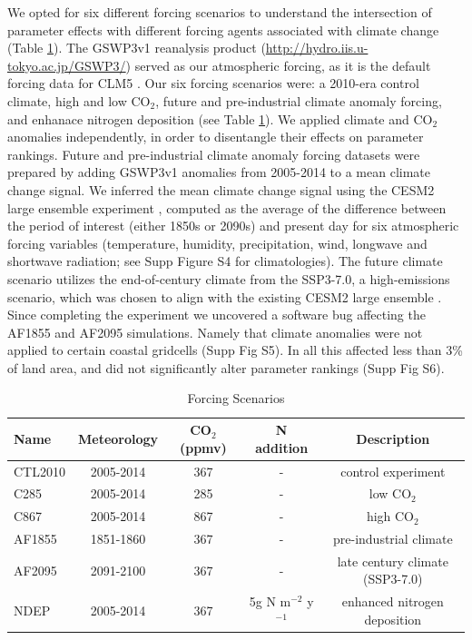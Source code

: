 \documentclass[draft]{agujournal2019}
\begin{document}
 We opted for six different forcing scenarios to understand the intersection of parameter effects with different forcing agents associated with climate change (Table \ref{tab:exps}). The GSWP3v1 reanalysis product (\url{http://hydro.iis.u-tokyo.ac.jp/GSWP3/}) served as our atmospheric forcing, as it is the default forcing data for CLM5 \cite{lawrence2019}. Our six forcing scenarios were: a 2010-era control climate, high and low CO$_2$, future and pre-industrial climate anomaly forcing, and enhanace nitrogen deposition (see Table \ref{tab:exps}).  We applied climate and CO$_2$ anomalies independently, in order to disentangle their effects on parameter rankings. Future and pre-industrial climate anomaly forcing datasets were prepared by adding GSWP3v1 anomalies from 2005-2014 to a mean climate change signal. We inferred the mean climate change signal using the CESM2 large ensemble experiment \cite{rodgers2021}, computed as the average of the difference between the period of interest (either 1850s or 2090s) and present day for six atmospheric forcing variables (temperature, humidity, precipitation, wind, longwave and shortwave radiation; see Supp Figure S4 for climatologies). The future climate scenario utilizes the end-of-century climate from the SSP3-7.0, a high-emissions scenario, which was chosen to align with the existing CESM2 large ensemble \cite{rodgers2021}. Since completing the experiment we uncovered a software bug affecting the AF1855 and AF2095 simulations. Namely that climate anomalies were not applied to certain coastal gridcells (Supp Fig S5). In all this affected less than 3\% of land area, and did not significantly alter parameter rankings (Supp Fig S6).  


 

\label{sect:exps}
 \begin{table}[h]
 \caption{Forcing Scenarios}
 \centering
 \begin{tabular}{l c c c c}
 \hline
  Name  & Meteorology & CO$_2$ (ppmv) & N addition & Description \\
 \hline
   CTL2010  & 2005-2014 & 367 & - & control experiment\\
   C285        & 2005-2014 & 285 & - & low CO$_2$ \\
   C867        & 2005-2014 & 867 & - & high CO$_2$ \\
   AF1855    & 1851-1860 & 367 & - & pre-industrial climate \\
   AF2095    & 2091-2100 & 367 & - & late century climate (SSP3-7.0) \\
   NDEP      & 2005-2014 & 367 & 5g N m$^{-2}$  y$^{-1}$ & enhanced nitrogen deposition \\
 \hline
 \end{tabular}
 \label{tab:exps}
 \end{table}
\end{document}
